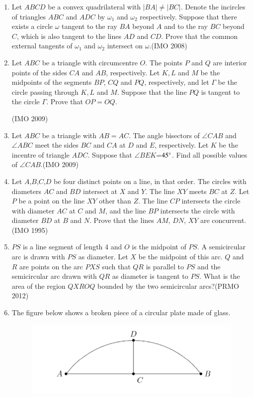 \begin{enumerate}[label=\thesubsection.\arabic*,ref=\thesubsection.\theenumi]
	\item Let $ABCD$ be a convex quadrilateral with $|BA| \neq |BC|$. Denote the incircles of triangles $ABC$ and $ADC$ by $\omega_{1}$ and $\omega_{2}$ respectively. Suppose that there exists a circle $\omega$ tangent to the ray $BA$ beyond $A$ and to the ray $BC$ beyond $C$, which is also tangent to the lines $AD$ and $CD$. Prove that the common external tangents of $\omega_{1}$ and $\omega_{2}$ intersect on $\omega$.\hfill(IMO  2008)
		\item Let $ABC$ be a triangle with circumcentre $O$. The points $P$  and $Q$ are interior points of the sides $CA$ and $AB$, respectively. Let $K,L$ and $M$ be the midpoints of the segments $BP$, $CQ$ and $PQ$, respectively, and let $\Gamma$ be the circle passing through $K,L$ and $M$. Suppose that the line $PQ$ is tangent to the circle $\Gamma$. Prove that $OP=OQ$.

			\hfill(IMO  2009)
	\item Let $ABC$ be a triangle with $AB=AC$. The angle bisectors of $\angle CAB$ and $\angle ABC$ meet the sides $BC$ and $CA$ at $D$ and $E$, respectively. Let $K$ be the incentre of triangle $ADC$. Suppose that $ \angle BEK$=$45\degree$. Find all possible values of $\angle CAB$.\hfill(IMO  2009)
	\item Let $A$,$B$,$C$,$D$ be four distinct points on a line, in that order. The circles with diameters $AC$ and $BD$ intersect at $X$ and $Y$. The line $XY$ meets $BC$ at $Z$. Let $P$ be a point on the line $XY$ other than $Z$. The line $CP$ intersects the circle with diameter $AC$ at $C$ and $M$, and the line $BP$ intersects the circle with diameter $BD$ at $B$ and $N$. Prove that the lines $AM$, $DN$, $XY$ are concurrent.\hfill(IMO  1995)
\item $PS$ is a line segment of length 4 and $O$ is the midpoint of $PS$. A semicircular arc is drawn with $PS$ as diameter. Let $X$ be the midpoint of this arc. $Q$ and $R$ are points on the arc $PXS$ such that $QR$ is parallel to $PS$ and the semicircular arc drawn with $QR$ as diameter is tangent to $PS$. What is the area of the region $QXROQ$ bounded by the two semicircular arcs?\hfill(PRMO 2012)
\item The figure below shows a broken piece of a circular plate made of glass.
		\begin{figure}[h!]
    \centering
	    \includegraphics[width=\columnwidth]{olympiad/figs/permo.jpg}
			\caption{}
			\label{fig:plate}
    \end{figure}




\end{enumerate}
